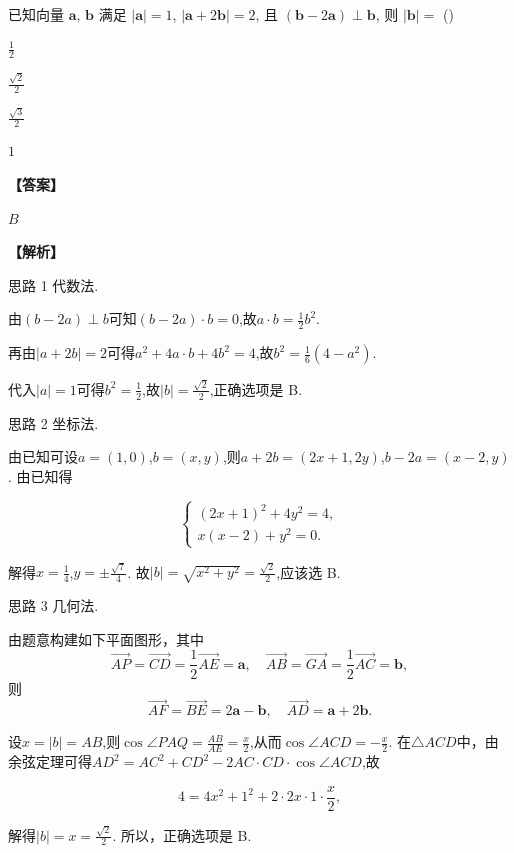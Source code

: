 \documentclass{exam-zh}
\newenvironment{answer}{\par\vspace{0.5em}\noindent\textbf{【答案】}\par}{\par\vspace{1em}}
\newenvironment{solutions}{\par\vspace{0.5em}\noindent\textbf{【解析】}\par}{\par\vspace{1em}}\usepackage{lastpage}
\begin{document}

\begin{question}
已知向量 $\boldsymbol{a}$, $\boldsymbol{b}$ 满足 $|\boldsymbol{a}|=1$, $|\boldsymbol{a}+2\boldsymbol{b}|=2$, 且 $(\boldsymbol{b}-2\boldsymbol{a}) \perp \boldsymbol{b}$, 则 $|\boldsymbol{b}|=$ (\hspace{1cm})
\begin{choices}
\item $\frac{1}{2}$
\item $\frac{\sqrt{2}}{2}$
\item $\frac{\sqrt{3}}{2}$
\item $1$
\end{choices}
\end{question}

\begin{answer}
$B$
\end{answer}

\begin{solutions}
思路 1 代数法.

由$(b-2a) \perp b$可知$(b-2a) \cdot b=0$,故$a \cdot b=\frac{1}{2}b^2$.

再由$|a+2b|=2$可得$a^2+4a \cdot b+4b^2=4$,故$b^2=\frac{1}{6}(4-a^2)$.

代入$|a|=1$可得$b^2=\frac{1}{2}$,故$|b|=\frac{\sqrt{2}}{2}$,正确选项是 B.

思路 2 坐标法.

由已知可设$a=(1,0)$,$b=(x,y)$,则$a+2b=(2x+1,2y)$,$b-2a=(x-2,y)$. 由已知得

$$
\begin{cases} (2x+1)^2+4y^2=4, \\ x(x-2)+y^2=0. \end{cases}
$$

解得$x=\frac{1}{4}$,$y=\pm\frac{\sqrt{7}}{4}$. 故$|b|=\sqrt{x^2+y^2}=\frac{\sqrt{2}}{2}$,应该选 B.

思路 3 几何法.

由题意构建如下平面图形，其中
\[
\overrightarrow{AP}=\overrightarrow{CD}=\frac{1}{2}\overrightarrow{AE}=\boldsymbol{a},\quad
\overrightarrow{AB}=\overrightarrow{GA}=\frac{1}{2}\overrightarrow{AC}=\boldsymbol{b},
\]
则
\[
\overrightarrow{AF}=\overrightarrow{BE}=2\boldsymbol{a}-\boldsymbol{b},\quad
\overrightarrow{AD}=\boldsymbol{a}+2\boldsymbol{b}.
\]

设$x=|b|=AB$,则$\cos \angle PAQ=\frac{AB}{AE}=\frac{x}{2}$,从而$\cos \angle ACD=-\frac{x}{2}$. 在$\triangle ACD$中，由余弦定理可得$AD^2=AC^2+CD^2-2AC \cdot CD \cdot \cos \angle ACD$,故

$$
4=4x^2+1^2+2 \cdot 2x \cdot 1 \cdot \frac{x}{2},
$$

解得$|b|=x=\frac{\sqrt{2}}{2}$. 所以，正确选项是 B.
\end{solutions}
\end{document}
